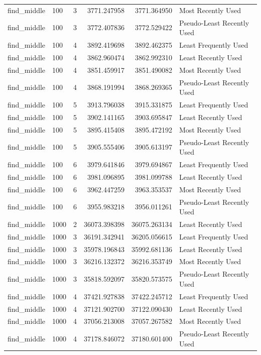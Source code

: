\begin{tabular}{llrrrl}
find_middle & 100 & 3 & 3771.247958 & 3771.364950 & Most Recently Used \\
find_middle & 100 & 3 & 3772.407836 & 3772.529422 & Pseudo-Least Recently Used \\
find_middle & 100 & 4 & 3892.419698 & 3892.462375 & Least Frequently Used \\
find_middle & 100 & 4 & 3862.960474 & 3862.992310 & Least Recently Used \\
find_middle & 100 & 4 & 3851.459917 & 3851.490082 & Most Recently Used \\
find_middle & 100 & 4 & 3868.191994 & 3868.269365 & Pseudo-Least Recently Used \\
find_middle & 100 & 5 & 3913.796038 & 3915.331875 & Least Frequently Used \\
find_middle & 100 & 5 & 3902.141165 & 3903.695847 & Least Recently Used \\
find_middle & 100 & 5 & 3895.415408 & 3895.472192 & Most Recently Used \\
find_middle & 100 & 5 & 3905.555406 & 3905.613197 & Pseudo-Least Recently Used \\
find_middle & 100 & 6 & 3979.641846 & 3979.694867 & Least Frequently Used \\
find_middle & 100 & 6 & 3981.096895 & 3981.099788 & Least Recently Used \\
find_middle & 100 & 6 & 3962.447259 & 3963.353537 & Most Recently Used \\
find_middle & 100 & 6 & 3955.983218 & 3956.011261 & Pseudo-Least Recently Used \\
find_middle & 1000 & 2 & 36073.398398 & 36075.263134 & Least Recently Used \\
find_middle & 1000 & 3 & 36191.342941 & 36205.056615 & Least Frequently Used \\
find_middle & 1000 & 3 & 35978.196843 & 35992.681136 & Least Recently Used \\
find_middle & 1000 & 3 & 36216.132372 & 36216.353749 & Most Recently Used \\
find_middle & 1000 & 3 & 35818.592097 & 35820.573575 & Pseudo-Least Recently Used \\
find_middle & 1000 & 4 & 37421.927838 & 37422.245712 & Least Frequently Used \\
find_middle & 1000 & 4 & 37121.902700 & 37122.090430 & Least Recently Used \\
find_middle & 1000 & 4 & 37056.213008 & 37057.267582 & Most Recently Used \\
find_middle & 1000 & 4 & 37178.846072 & 37180.601400 & Pseudo-Least Recently Used \\

\end{tabular}
